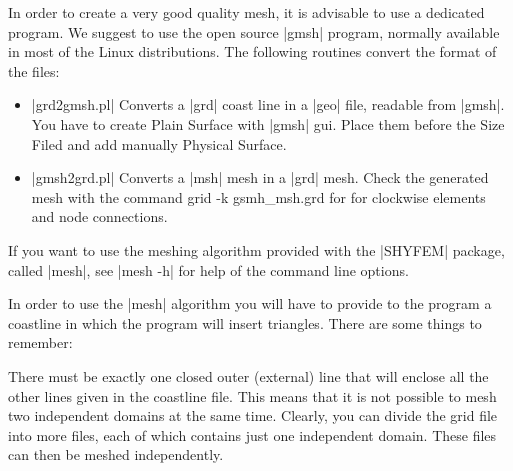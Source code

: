 
%
%
%
%
%
%
%

In order to create a very good quality mesh, it is advisable to use a
dedicated program. We suggest to use the open source |gmsh| program,
normally available in most of the Linux distributions.
The following routines convert the format of the files:

\begin{itemize}
     \item |grd2gmsh.pl| Converts a |grd| coast line in a |geo| file,
           readable from |gmsh|. You have to create Plain Surface with 
           |gmsh| gui. Place them before the Size Filed and add manually 
           Physical Surface.
     \item |gmsh2grd.pl| Converts a |msh| mesh in a |grd| mesh. Check the
           generated mesh with the command grid -k gsmh\_msh.grd for for
           clockwise elements and node connections.
\end{itemize}

If you want to use the meshing algorithm provided with the |SHYFEM| package,
called |mesh|, see |mesh -h| for help of the command line options. 

In order to use the |mesh| algorithm you will have to provide to the program
a coastline in which the program will insert triangles. There are some
things to remember:

There must be exactly one closed outer (external) line that will enclose
all the other lines given in the coastline file. This means that it is
not possible to mesh two independent domains at the same time. Clearly,
you can divide the grid file into more files, each of which contains
just one independent domain. These files can then be meshed independently.

